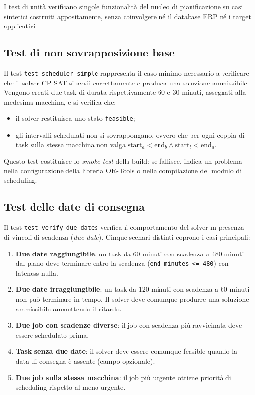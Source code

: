I test di unità verificano singole funzionalità del nucleo di pianificazione su casi sintetici costruiti appositamente, senza coinvolgere né il database ERP né i target applicativi.

\subsection{Test di non sovrapposizione base}

Il test \texttt{test\_scheduler\_simple} rappresenta il caso minimo necessario a verificare che il solver CP-SAT si avvii correttamente e produca una soluzione ammissibile. Vengono creati due task di durata rispettivamente 60 e 30 minuti, assegnati alla medesima macchina, e si verifica che:

\begin{itemize}
    \item il solver restituisca uno stato \texttt{feasible};
    \item gli intervalli schedulati non si sovrappongano, ovvero che per ogni coppia di task sulla stessa macchina non valga $\text{start}_a < \text{end}_b \wedge \text{start}_b < \text{end}_a$.
\end{itemize}

Questo test costituisce lo \textit{smoke test} della build: se fallisce, indica un problema nella configurazione della libreria OR-Tools o nella compilazione del modulo di scheduling.

\subsection{Test delle date di consegna}

Il test \texttt{test\_verify\_due\_dates} verifica il comportamento del solver in presenza di vincoli di scadenza (\textit{due date}). Cinque scenari distinti coprono i casi principali:

\begin{enumerate}
    \item \textbf{Due date raggiungibile}: un task da 60 minuti con scadenza a 480 minuti dal piano deve terminare entro la scadenza (\texttt{end\_minutes <= 480}) con lateness nulla.
    \item \textbf{Due date irraggiungibile}: un task da 120 minuti con scadenza a 60 minuti non può terminare in tempo. Il solver deve comunque produrre una soluzione ammissibile ammettendo il ritardo.
    \item \textbf{Due job con scadenze diverse}: il job con scadenza più ravvicinata deve essere schedulato prima.
    \item \textbf{Task senza due date}: il solver deve essere comunque feasible quando la data di consegna è assente (campo opzionale).
    \item \textbf{Due job sulla stessa macchina}: il job più urgente ottiene priorità di scheduling rispetto al meno urgente.
\end{enumerate}


